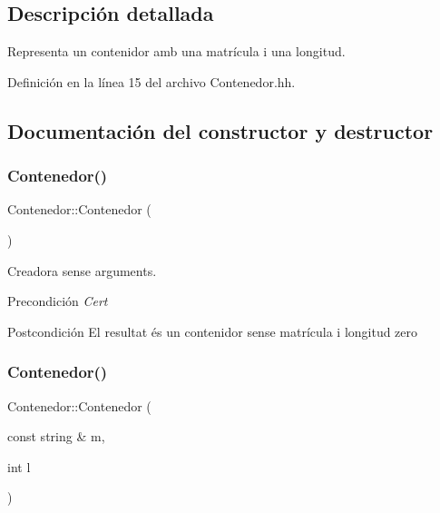 \subsection{Descripción detallada}
Representa un contenidor amb una matrícula i una longitud. 

Definición en la línea 15 del archivo Contenedor.\+hh.



\subsection{Documentación del constructor y destructor}
\mbox{\label{class_contenedor_a1edc43fbcead41c4eba6530b7099cefd}} 
\subsubsection{\texorpdfstring{Contenedor()}{Contenedor()}\hspace{0.1cm}{\footnotesize\ttfamily [1/3]}}
{\footnotesize\ttfamily Contenedor\+::\+Contenedor (\begin{DoxyParamCaption}{ }\end{DoxyParamCaption})}



Creadora sense arguments. 

\begin{DoxyPrecond}{Precondición}
{\itshape Cert} 
\end{DoxyPrecond}
\begin{DoxyPostcond}{Postcondición}
El resultat és un contenidor sense matrícula i longitud zero 
\end{DoxyPostcond}
\mbox{\label{class_contenedor_a84c6c247b6e5939fdd160160b1d1f449}} 
\subsubsection{\texorpdfstring{Contenedor()}{Contenedor()}\hspace{0.1cm}{\footnotesize\ttfamily [2/3]}}
{\footnotesize\ttfamily Contenedor\+::\+Contenedor (\begin{DoxyParamCaption}\item[{const string \&}]{m,  }\item[{int}]{l }\end{DoxyParamCaption})}



